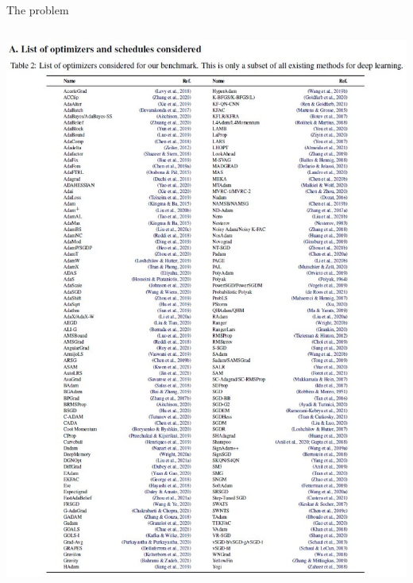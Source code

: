 \documentclass{beamer}
\begin{document}
\begin{frame}[fragile]{The problem}
\begin{columns}
            \includegraphics[width=\textwidth]{DL_optimizers}
    \end{columns}

\end{frame}
\end{document}
